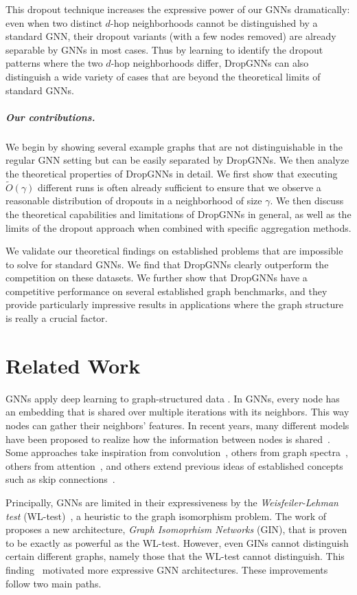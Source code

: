 \documentclass{article}
\begin{document}
This dropout technique increases the expressive power of our GNNs dramatically: even when two distinct $d$-hop neighborhoods cannot be distinguished by a standard GNN, their dropout variants (with a few nodes removed) are already separable by GNNs in most cases. Thus by learning to identify the dropout patterns where the two $d$-hop neighborhoods differ, DropGNNs can also distinguish a wide variety of cases that are beyond the theoretical limits of standard GNNs.

\subparagraph*{Our contributions.} We begin by showing several example graphs that are not distinguishable in the regular GNN setting but can be easily separated by DropGNNs. We then analyze the theoretical properties of DropGNNs in detail. We first show that executing $\widetilde{O}(\gamma)$ different runs is often already sufficient to ensure that we observe a reasonable distribution of dropouts in a neighborhood of size $\gamma$. We then discuss the theoretical capabilities and limitations of DropGNNs in general, as well as the limits of the dropout approach when combined with specific aggregation methods.

We validate our theoretical findings on established problems that are impossible to solve for standard GNNs. We find that DropGNNs clearly outperform the competition on these datasets. We further show that DropGNNs have a competitive performance on several established graph benchmarks, and they provide particularly impressive results in applications where the graph structure is really a crucial factor.

\section{Related Work}
GNNs apply deep learning to graph-structured data \citep{scarselli2008graph}. In GNNs, every node has an embedding that is shared over multiple iterations with its neighbors. This way nodes can gather their neighbors' features. In recent years, many different models have been proposed to realize how the information between nodes is shared~\citep{wu2020comprehensive}. Some approaches take inspiration from convolution~\citep{niepert2016learning, defferrard2016convolutional, hamilton2017inductive}, others from graph spectra~\citep{kipf2017semisupervised, bruna2014spectral}, others from attention~\citep{velickovic2018graph}, and others extend previous ideas of established concepts such as skip connections~\citep{xu2018jumping}.

Principally, GNNs are limited in their expressiveness by the \textit{Weisfeiler-Lehman test} (WL-test)~\citep{GIN}, a heuristic to the graph isomorphism problem. The work of \cite{GIN} proposes a new architecture, \textit{Graph Isomoprhism Networks} (GIN), that is proven to be exactly as powerful as the WL-test. However, even GINs cannot distinguish certain different graphs, namely those that the WL-test cannot distinguish. This finding~\citep{limits} motivated more expressive GNN architectures. These improvements follow two main paths.
\end{document}
